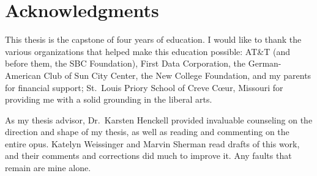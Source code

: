 
\bigskip

\begingroup
\let\clearpage\relax
\let\cleardoublepage\relax
\let\cleardoublepage\relax
\chapter*{Acknowledgments}
This thesis is the capstone of four years of education. I would like to thank the various organizations that helped make this education possible: AT\&T (and before them, the SBC Foundation), First Data Corporation, the German-American Club of Sun City Center, the New College Foundation, and my parents for financial support; St.~Louis Priory School of Creve C\oe ur, Missouri for providing me with a solid grounding in the liberal arts.

As my thesis advisor, Dr.~Karsten Henckell provided invaluable counseling on the direction and shape of my thesis, as well as reading and commenting on the entire opus. Katelyn Weissinger and Marvin Sherman read drafts of this work, and their comments and corrections did much to improve it. Any faults that remain are mine alone.
\endgroup



